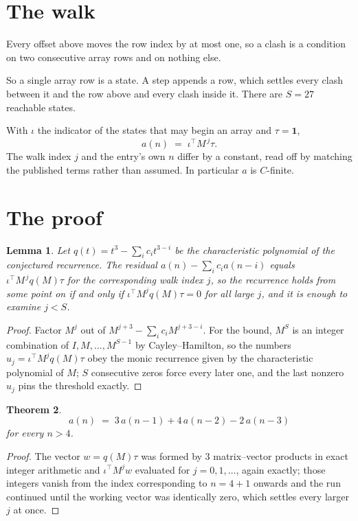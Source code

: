 \documentclass[11pt,a4paper]{article}
\theoremstyle{plain}
\newtheorem{theorem}{Theorem}
\newtheorem{lemma}[theorem]{Lemma}
\theoremstyle{definition}
\begin{document}
\section{The walk}

Every offset above moves the row index by at most one, so a clash is a condition on two
consecutive array rows and on nothing else.

So a single array row is a state. A step appends a row, which settles every clash between it
and the row above and every clash inside it. There are $S=27$ reachable states.

With $\iota$ the indicator of the states that may begin an array and $\tau=\mathbf{1}$,
\[
a(n)\;=\;\iota^{\!\top}M^{\,j}\tau .
\]
The walk index $j$ and the entry's own $n$ differ by a constant, read off by matching the
published terms rather than assumed. In particular $a$ is $C$-finite.

\section{The proof}

\begin{lemma}\label{lem:crit}
Let $q(t)=t^{3}-\sum_i c_it^{3-i}$ be the characteristic polynomial of the
conjectured recurrence. The residual $a(n)-\sum_ic_ia(n-i)$ equals
$\iota^{\!\top}M^{\,j}q(M)\tau$ for the corresponding walk index $j$, so the recurrence
holds from some point on if and only if $\iota^{\!\top}M^{j}q(M)\tau=0$ for all large $j$,
and it is enough to examine $j<S$.
\end{lemma}

\begin{proof}
Factor $M^{j}$ out of $M^{j+3}-\sum_ic_iM^{j+3-i}$. For the bound, $M^{S}$
is an integer combination of $I,M,\dots,M^{S-1}$ by Cayley--Hamilton, so the numbers
$u_j=\iota^{\!\top}M^{j}q(M)\tau$ obey the monic recurrence given by the characteristic
polynomial of $M$; $S$ consecutive zeros force every later one, and the last nonzero $u_j$
pins the threshold exactly.
\end{proof}

\begin{theorem}
\[
a(n)\;=\;3\,a(n-1) + 4\,a(n-2) - 2\,a(n-3)
\]
for every $n>4$.
\end{theorem}

\begin{proof}
The vector $w=q(M)\tau$ was formed by $3$ matrix--vector products in exact integer
arithmetic and $\iota^{\!\top}M^{j}w$ evaluated for $j=0,1,\dots$, again exactly; those
integers vanish from the index corresponding to $n=4+1$ onwards and the run continued
until the working vector was identically zero, which settles every larger $j$ at once.
\end{proof}
\end{document}
